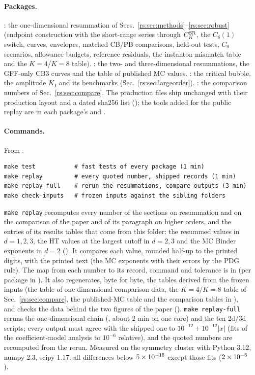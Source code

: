 \paragraph{Packages.} : the one-dimensional resummation of
Secs.~\ref{rs:sec:methods}--\ref{rs:sec:robust} (endpoint construction with the short-range series
through $C^{\mathrm{SR}}_K$, the $C_8(1)$ switch, curves, envelopes, matched CB/PB comparisons, held-out
tests, $C_9$ scenarios, allowance budgets, reference residuals, the instanton-mismatch table and
the $K=4$/$K=8$ table). : the two- and three-dimensional resummations,
the GFF-only CB3 curves and the table of published MC values. : the
critical bubble, the amplitude $K_I$ and its benchmarks (Sec.~\ref{rs:sec:largeorder}).
: the comparison numbers of Sec.~\ref{rs:sec:compare}. The production files
ship unchanged with their production layout and a dated sha256 list
(); the tools added for the public replay are in each package's
 and .

\paragraph{Commands.} From :
\begin{verbatim}
make test           # fast tests of every package (1 min)
make replay         # every quoted number, shipped records (1 min)
make replay-full    # rerun the resummations, compare outputs (3 min)
make check-inputs   # frozen inputs against the sibling folders
\end{verbatim}
\texttt{make replay} recomputes every number of the sections on resummation and on the
comparison of the paper \cite{rs:LRIpaper} and of its paragraph on higher orders, and the
entries of its results tables that come from this folder: the resummed values in $d=1,2,3$, the
HT values at the largest cutoff in $d=2,3$ and the MC Binder exponents in $d=2$
(). It compares each value, rounded half-up to the printed
digits, with the printed text (the MC exponents with their errors by the PDG rule). The map from each number to its record, command
and tolerance is in  (per package in
). It also regenerates, byte for
byte, the tables derived from the frozen inputs (the table of one-dimensional comparison data,
the $K=4$/$K=8$ table of Sec.~\ref{rs:sec:compare}, the published-MC table and the comparison tables
in ), and checks the data behind the two figures of the paper
(). \texttt{make replay-full} reruns the one-dimensional chain
(, about 2 min on one core) and the
ten 2d/3d scripts; every output must agree with the shipped one to $10^{-12}+10^{-12}|x|$ (fits of
the coefficient-model analysis to $10^{-6}$ relative), and the quoted numbers are recomputed from
the rerun. Measured on the symmetry cluster with Python 3.12, numpy 2.3, scipy 1.17: all differences
below $5\times10^{-15}$ except those fits ($2\times10^{-6}$).

